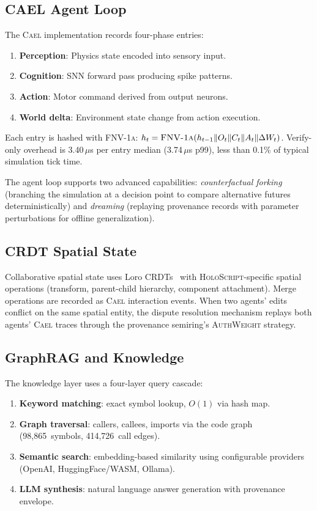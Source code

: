 \documentclass[sigchi-a]{acmart}
\newcommand{\holoscript}{\textsc{HoloScript}}
\newcommand{\cael}{\textsc{Cael}}
\newcommand{\fnvhash}{\textsc{FNV-1a}}
\begin{document}
\subsection{CAEL Agent Loop}

The \cael{} implementation records four-phase entries:

\begin{enumerate}
  \item \textbf{Perception}: Physics state encoded into sensory input.
  \item \textbf{Cognition}: SNN forward pass producing spike patterns.
  \item \textbf{Action}: Motor command derived from output neurons.
  \item \textbf{World delta}: Environment state change from action execution.
\end{enumerate}

Each entry is hashed with \fnvhash{}: $h_t = \textsc{FNV-1a}(h_{t-1} \|
O_t \| C_t \| A_t \| \Delta W_t)$. Verify-only overhead is 3.40\,$\mu$s per entry median
(3.74\,$\mu$s p99), less than 0.1\% of typical simulation tick time.

The agent loop supports two advanced capabilities: \emph{counterfactual
forking} (branching the simulation at a decision point to compare alternative
futures deterministically) and \emph{dreaming} (replaying provenance records
with parameter perturbations for offline generalization).

\subsection{CRDT Spatial State}

Collaborative spatial state uses Loro CRDTs~\cite{loro2024} with
\holoscript{}-specific spatial operations (transform, parent-child hierarchy,
component attachment). Merge operations are recorded as \cael{} interaction
events. When two agents' edits conflict on the same spatial entity, the
dispute resolution mechanism replays both agents' \cael{} traces through
the provenance semiring's \textsc{AuthWeight} strategy.

\subsection{GraphRAG and Knowledge}

The knowledge layer uses a four-layer query cascade:

\begin{enumerate}
  \item \textbf{Keyword matching}: exact symbol lookup, $O(1)$ via hash map.
  \item \textbf{Graph traversal}: callers, callees, imports via the code
    graph (98,865~symbols, 414,726~call edges).
  \item \textbf{Semantic search}: embedding-based similarity using
    configurable providers (OpenAI, HuggingFace/WASM, Ollama).
  \item \textbf{LLM synthesis}: natural language answer generation with
    provenance envelope.
\end{enumerate}
\end{document}
